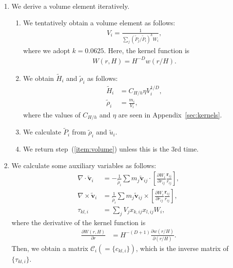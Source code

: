 \documentclass[fleqn,dvipdfmx]{article}
\begin{document}
\begin{enumerate}
\item We derive a volume element iteratively.

  \begin{enumerate}
  \item \label{item:volume} We tentatively obtain a volume element as
    follows:
    \begin{align}
      V_i = \frac{1}{\sum_j (\tilde{P}_j/\tilde{P}_i)^k W_i},
    \end{align}
    where we adopt $k=0.0625$. Here, the kernel function is
    \begin{align}
      W(r,H) = H^{-D} w(r/H).
    \end{align}

  \item We obtain $\tilde{H}_i$ and $\tilde{\rho}_i$ as follows:
    \begin{align}
      \tilde{H}_i    &= C_{H/h} \eta V_i^{1/D}, \\
      \tilde{\rho}_i &= \frac{m_i}{V_i},
    \end{align}
    where the values of $C_{H/h}$ and $\eta$ are seen in
    Appendix~\ref{sec:kernels}.

  \item We calculate $\tilde{P}_i$ from $\tilde{\rho}_i$ and
    $\tilde{u}_i$.

  \item We return step~(\ref{item:volume}) unless this is the 3rd
    time.

  \end{enumerate}

\item We calculate some auxiliary variables as follows:
  \begin{align}
    \nabla \cdot \tilde{\bm{v}}_i &= - \frac{1}{\tilde{\rho}_i} \sum
    m_j \tilde{\bm{v}}_{ij} \cdot \left[\frac{\partial W_i}{\partial
        r_{ij}} \frac{\bm{r}_{ij}}{r_{ij}} \right], \\
    \nabla \times \tilde{\bm{v}}_i &= \frac{1}{\tilde{\rho}_i} \sum
    m_j \tilde{\bm{v}}_{ij} \times \left[\frac{\partial W_i}{\partial
        r_{ij}} \frac{\bm{r}_{ij}}{r_{ij}} \right], \\
    \tau_{kl,i} &= \sum_j V_j x_{k,ij} x_{l,ij} W_i,
  \end{align}
  where the derivative of the kernel function is
  \begin{align}
    \frac{\partial W(r,H)}{\partial r} &= H^{-(D+1)} \frac{\partial
      w(r/H)}{\partial (r/H)}.
  \end{align}
  Then, we obtain a matrix $\mathcal{C}_i (=\{c_{kl,i}\})$, which is
  the inverse matrix of $\{\tau_{kl,i}\}$.


\end{enumerate}
\end{document}
